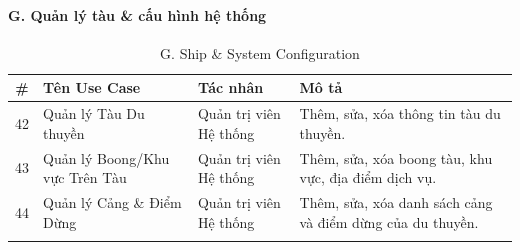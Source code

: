 \documentclass[12pt,a4paper]{article}
\begin{document}
	\paragraph{G. Quản lý tàu \& cấu hình hệ thống}
	\begin{longtable}{|c|p{4.5cm}|p{3.5cm}|p{4.5cm}|}
		\hline
		\textbf{\#} & \textbf{Tên Use Case} & \textbf{Tác nhân} & \textbf{Mô tả} \\
		\hline
		42 & Quản lý Tàu Du thuyền & Quản trị viên Hệ thống & Thêm, sửa, xóa thông tin tàu du thuyền. \\
		\hline
		43 & Quản lý Boong/Khu vực Trên Tàu & Quản trị viên Hệ thống & Thêm, sửa, xóa boong tàu, khu vực, địa điểm dịch vụ. \\
		\hline
		44 & Quản lý Cảng \& Điểm Dừng & Quản trị viên Hệ thống & Thêm, sửa, xóa danh sách cảng và điểm dừng của du thuyền. \\
		\hline
		\caption*{G. Ship \& System Configuration}
	\end{longtable}
	
\end{document}

